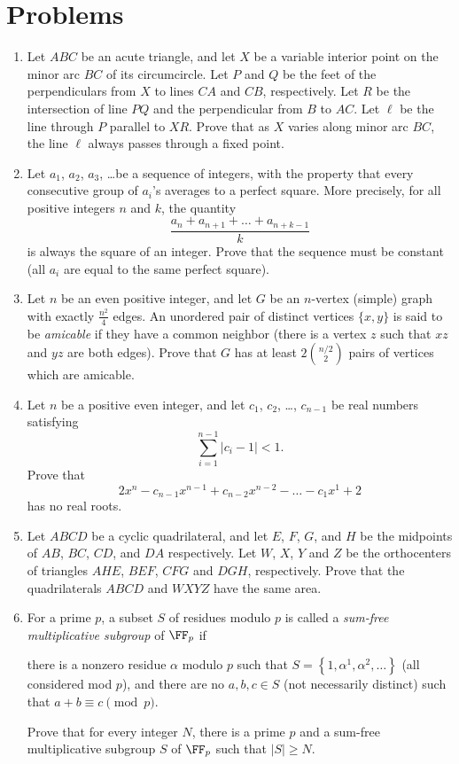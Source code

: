 \documentclass[11pt]{scrartcl}
\begin{document}
\section{Problems}
\begin{enumerate}[\bfseries 1.]
\item %
Let $ABC$ be an acute triangle, and let $X$ be a variable interior point
on the minor arc $BC$ of its circumcircle.
Let $P$ and $Q$ be the feet of the perpendiculars from $X$ to lines $CA$ and $CB$, respectively.
Let $R$ be the intersection of line $PQ$ and the perpendicular from $B$ to $AC$.
Let $\ell$ be the line through $P$ parallel to $XR$.
Prove that as $X$ varies along minor arc $BC$,
the line $\ell$ always passes through a fixed point.

\item %
Let $a_1$, $a_2$, $a_3$, \dots be a sequence of integers,
with the property that every consecutive group of $a_i$'s
averages to a perfect square.
More precisely, for all positive integers $n$ and $k$, the quantity
 \[ \frac{a_n + a_{n+1} + \dots + a_{n+k-1}}{k} \]
is always the square of an integer.
Prove that the sequence must be constant
(all $a_i$ are equal to the same perfect square).

\item %
Let $n$ be an even positive integer,
and let $G$ be an $n$-vertex (simple) graph
with exactly $\frac{n^2}{4}$ edges.
An unordered pair of distinct vertices $\{x,y\}$
is said to be \emph{amicable} if they have a common neighbor
(there is a vertex $z$ such that $xz$ and $yz$ are both edges).
Prove that $G$ has at least $2\binom{n/2}{2}$
pairs of vertices which are amicable.

\item %
Let $n$ be a positive even integer,
and let $c_1$, $c_2$, \dots, $c_{n-1}$ be real numbers satisfying
\[ \sum_{i=1}^{n-1} \left\lvert c_i-1 \right\rvert < 1. \]
Prove that
\[ 2x^n - c_{n-1}x^{n-1} + c_{n-2}x^{n-2} - \dots - c_1x^1 + 2 \]
has no real roots.

\item %
Let $ABCD$ be a cyclic quadrilateral,
and let $E$, $F$, $G$, and $H$ be the midpoints of $AB$, $BC$, $CD$, and $DA$ respectively.
Let $W$, $X$, $Y$ and $Z$ be the orthocenters of
triangles $AHE$, $BEF$, $CFG$ and $DGH$, respectively.
Prove that the quadrilaterals $ABCD$ and $WXYZ$ have the same area.

\item %
For a prime $p$, a subset $S$ of residues modulo $p$
is called a \emph{sum-free multiplicative subgroup}
of $\FF_p$ if
\begin{itemize}
  \ii there is a nonzero residue $\alpha$ modulo $p$
  such that $S = \left\{ 1, \alpha^1, \alpha^2, \dots \right\}$
  (all considered mod $p$), and
  \ii there are no $a,b,c \in S$
  (not necessarily distinct) such that $a+b \equiv c \pmod p$.
\end{itemize}
Prove that for every integer $N$,
there is a prime $p$ and a sum-free multiplicative subgroup $S$
of $\FF_p$ such that $\left\lvert S \right\rvert \ge N$.

\end{enumerate}
\pagebreak
\end{document}

